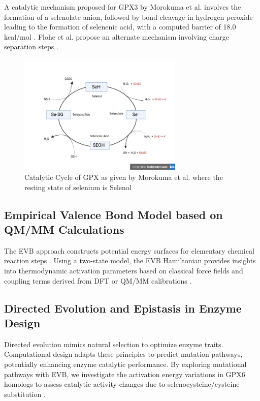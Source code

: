 \documentclass[journal=jacsat,manuscript=article]{achemso}
\begin{document}
A catalytic mechanism proposed for GPX3 by Morokuma et al. involves the formation of a selenolate anion, followed by bond cleavage in hydrogen peroxide leading to the formation of selenenic acid, with a computed barrier of 18.0 kcal/mol \cite{Prabhakar2006}. Flohe et al. propose an alternate mechanism involving charge separation steps \cite{Orian2015}.

\begin{figure}[h]
\includegraphics[width=0.7\textwidth]{figures/Catalytic_cycle.png}
\caption{Catalytic Cycle of GPX as given by Morokuma et al. where the resting state of selenium is Selenol}
\label{fig:figure1}
\end{figure}

\subsection{Empirical Valence Bond Model based on QM/MM Calculations}

The EVB approach constructs potential energy surfaces for elementary chemical reaction steps \cite{Oanca2024}. Using a two-state model, the EVB Hamiltonian provides insights into thermodynamic activation parameters based on classical force fields and coupling terms derived from DFT or QM/MM calibrations \cite{Oanca2023}.

\subsection{Directed Evolution and Epistasis in Enzyme Design}

Directed evolution mimics natural selection to optimize enzyme traits. Computational design adapts these principles to predict mutation pathways, potentially enhancing enzyme catalytic performance. By exploring mutational pathways with EVB, we investigate the activation energy variations in GPX6 homologs to assess catalytic activity changes due to selenocysteine/cysteine substitution \cite{Starr2016, Storz2018}.
\end{document}
